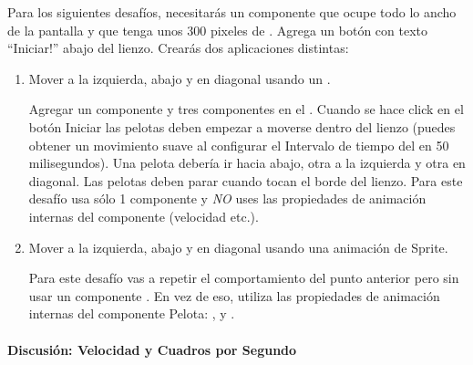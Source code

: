 Para los siguientes desafíos, necesitarás un componente
 que ocupe todo lo ancho de la pantalla y que tenga
unos 300 pixeles de .  Agrega un botón con texto
``Iniciar!'' abajo del lienzo. Crearás dos aplicaciones distintas:

\begin{enumerate}

\item Mover a la izquierda, abajo y en diagonal usando un
  .

  Agregar un componente  y tres componentes
   en el .  Cuando se hace click
  en el botón Iniciar las pelotas deben empezar a moverse dentro del
  lienzo (puedes obtener un movimiento suave al configurar el
  Intervalo de tiempo del  en 50 milisegundos). Una
  pelota debería ir hacia abajo, otra a la izquierda y otra en
  diagonal. Las pelotas deben parar cuando tocan el borde del
  lienzo. Para este desafío usa sólo 1 componente  y
  \emph{NO} uses las propiedades de animación internas del componente
   (velocidad etc.).

\item Mover a la izquierda, abajo y en diagonal usando una animación
  de Sprite.

  Para este desafío vas a repetir el comportamiento del punto anterior
  pero sin usar un componente . En vez de eso,
  utiliza las propiedades de animación internas del componente Pelota:
  ,  y .

\end{enumerate}

\paragraph{Discusión: Velocidad y Cuadros por Segundo}

